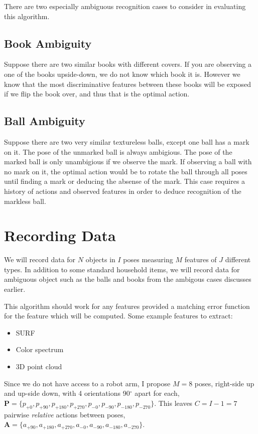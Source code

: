 \documentclass[11pt]{article}
\newcommand{\SetOf}[1]{\mathbf{#1}} %
\newcommand{\degrees}[1]{#1$^{\circ}$} %
\newcommand{\italic}[1]{\textit{#1}} %
\begin{document}
	There are two especially ambiguous recognition cases to consider in evaluating this algorithm. 
\subsection{Book Ambiguity}

	Suppose there are two similar books with different covers. If you are observing a one of the books upside-down, we do not know which book it is. However we know that the most discriminative features between these books will be exposed if we flip the book over, and thus that is the optimal action.
\subsection{Ball Ambiguity}

	Suppose there are two very similar textureless balls, except one ball has a mark on it. The pose of the unmarked ball is always ambigious. The pose of the marked ball is only unambigious if we observe the mark. If observing a ball with no mark on it, the optimal action would be to rotate the ball through all poses until finding a mark or deducing the absense of the mark. This case requires a history of actions and observed features in order to deduce recognition of the markless ball.
\section{Recording Data}
	We will record data for $N$ objects in $I$ poses measuring $M$ features of $J$ different types. In addition to some standard household items, we will record data for ambiguous object such as the balls and books from the ambigous cases discusses earlier.

	This algorithm should work for any features provided a matching error function for the feature which will be computed. Some example features to extract:

	\begin{itemize}
	 \item SURF
	 \item Color spectrum
	 \item 3D point cloud
	\end{itemize}

	Since we do not have access to a robot arm, I propose $M=8$ poses, right-side up and up-side down, with 4 orientations \degrees{90} apart for each, $\SetOf{P}=\{p_{+0},p_{+90},p_{+180},p_{+270},p_{-0},p_{-90},p_{-180},p_{-270}\}$. This leaves $C=I-1=7$ pairwise \italic{relative} actions between poses, $\SetOf{A}=\{a_{+90},a_{+180},a_{+270},a_{-0},a_{-90},a_{-180},a_{-270}\}$.
\end{document}
